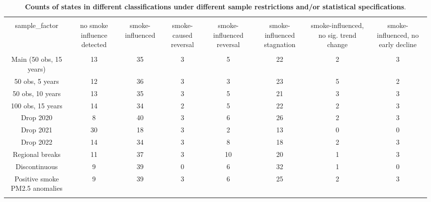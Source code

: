 \begin{table}[!htbp] \centering 
  \caption{\textbf{Counts of states in different classifications under different sample restrictions and/or statistical specifications}.} 
  \label{table:smokeinfluence} 
\footnotesize 
\begin{tabular}{@{\extracolsep{5pt}} cccccccc} 
\\[-1.8ex]\hline 
\hline \\[-1.8ex] 
sample\_factor & no smoke influence detected & smoke-influenced & smoke-caused reversal & smoke-influenced reversal & smoke-influenced stagnation & smoke-influenced, no sig. trend change & smoke-influenced, no early decline \\ 
\hline \\[-1.8ex] 
Main (50 obs, 15 years) & 13 & 35 & 3 & 5 & 22 & 2 & 3 \\ 
50 obs, 5 years & 12 & 36 & 3 & 3 & 23 & 5 & 2 \\ 
50 obs, 10 years & 13 & 35 & 3 & 5 & 21 & 3 & 3 \\ 
100 obs, 15 years & 14 & 34 & 2 & 5 & 22 & 2 & 3 \\ 
Drop 2020 & 8 & 40 & 3 & 6 & 26 & 2 & 3 \\ 
Drop 2021 & 30 & 18 & 3 & 2 & 13 & 0 & 0 \\ 
Drop 2022 & 14 & 34 & 3 & 8 & 18 & 2 & 3 \\ 
Regional breaks & 11 & 37 & 3 & 10 & 20 & 1 & 3 \\ 
Discontinuous & 9 & 39 & 0 & 6 & 32 & 1 & 0 \\ 
Positive smoke
PM2.5 anomalies & 9 & 39 & 3 & 6 & 25 & 2 & 3 \\ 
\hline \\[-1.8ex] 
\end{tabular} 
\end{table} 
